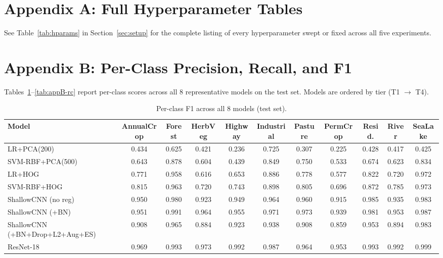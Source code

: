 \documentclass[10pt,letterpaper]{article}
\begin{document}
\appendix
\section{Appendix A: Full Hyperparameter Tables}
See Table~\ref{tab:hparams} in Section~\ref{sec:setup} for the complete listing of every hyperparameter swept or fixed across all five experiments.

\section{Appendix B: Per-Class Precision, Recall, and F1}
Tables~\ref{tab:appB-f1}--\ref{tab:appB-rc} report per-class scores across all 8 representative models on the test set. Models are ordered by tier (T1 $\rightarrow$ T4).

\begin{table}[h]
\centering
\tiny
\caption{Per-class F1 across all 8 models (test set).}
\label{tab:appB-f1}
\begin{tabular}{lcccccccccc}
\toprule
\textbf{Model} & \textbf{AnnualCrop} & \textbf{Forest} & \textbf{HerbVeg} & \textbf{Highway} & \textbf{Industrial} & \textbf{Pasture} & \textbf{PermCrop} & \textbf{Resid.} & \textbf{River} & \textbf{SeaLake} \\
\midrule
LR+PCA(200) & 0.434 & 0.625 & 0.421 & 0.236 & 0.725 & 0.307 & 0.225 & 0.428 & 0.417 & 0.425 \\
SVM-RBF+PCA(500) & 0.643 & 0.878 & 0.604 & 0.439 & 0.849 & 0.750 & 0.533 & 0.674 & 0.623 & 0.834 \\
LR+HOG & 0.771 & 0.958 & 0.616 & 0.653 & 0.886 & 0.778 & 0.577 & 0.822 & 0.720 & 0.972 \\
SVM-RBF+HOG & 0.815 & 0.963 & 0.720 & 0.743 & 0.898 & 0.805 & 0.696 & 0.872 & 0.785 & 0.973 \\
ShallowCNN (no reg) & 0.950 & 0.980 & 0.923 & 0.949 & 0.964 & 0.960 & 0.915 & 0.985 & 0.935 & 0.983 \\
ShallowCNN (+BN) & 0.951 & 0.991 & 0.964 & 0.955 & 0.971 & 0.973 & 0.939 & 0.981 & 0.953 & 0.987 \\
ShallowCNN (+BN+Drop+L2+Aug+ES) & 0.908 & 0.965 & 0.884 & 0.923 & 0.938 & 0.908 & 0.859 & 0.953 & 0.894 & 0.983 \\
ResNet-18 & 0.969 & 0.993 & 0.973 & 0.992 & 0.987 & 0.964 & 0.953 & 0.993 & 0.992 & 0.999 \\
\bottomrule
\end{tabular}
\end{table}
\end{document}
